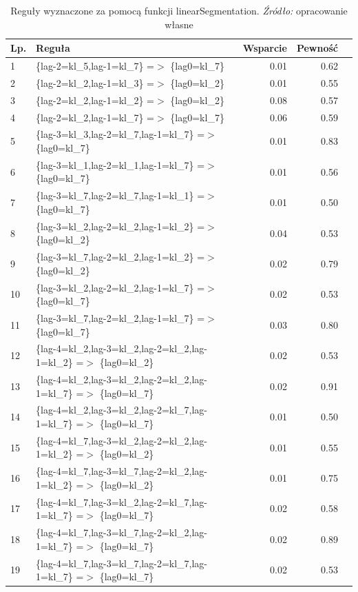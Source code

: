 \documentclass[polish, twoside, 12pt, a4paper]{article}
\theoremstyle{definition}
\theoremstyle{plain}
\theoremstyle{remark}
\begin{document}
\begin{table}[H]
\caption{Reguły wyznaczone za pomocą funkcji linearSegmentation. \textit{Źródło:} opracowanie własne}
\label{tab006}
\begin{tabular}{llrrr}
Lp. & Reguła & Wsparcie & Pewność  \\ 
  \hline
1 & \{lag-2=kl\_5,lag-1=kl\_7\} =$>$ \{lag0=kl\_7\} & 0.01 & 0.62  \\ 
2 & \{lag-2=kl\_2,lag-1=kl\_3\} =$>$ \{lag0=kl\_2\} & 0.01 & 0.55  \\ 
3 & \{lag-2=kl\_2,lag-1=kl\_2\} =$>$ \{lag0=kl\_2\} & 0.08 & 0.57  \\ 
4 & \{lag-2=kl\_2,lag-1=kl\_7\} =$>$ \{lag0=kl\_7\} & 0.06 & 0.59  \\ 
5 & \{lag-3=kl\_3,lag-2=kl\_7,lag-1=kl\_7\} =$>$ \{lag0=kl\_7\} & 0.01 & 0.83  \\ 
6 & \{lag-3=kl\_1,lag-2=kl\_1,lag-1=kl\_7\} =$>$ \{lag0=kl\_7\} & 0.01 & 0.56  \\ 
7 & \{lag-3=kl\_7,lag-2=kl\_7,lag-1=kl\_1\} =$>$ \{lag0=kl\_7\} & 0.01 & 0.50  \\ 
8 & \{lag-3=kl\_2,lag-2=kl\_2,lag-1=kl\_2\} =$>$ \{lag0=kl\_2\} & 0.04 & 0.53  \\ 
9 & \{lag-3=kl\_7,lag-2=kl\_2,lag-1=kl\_2\} =$>$ \{lag0=kl\_2\} & 0.02 & 0.79  \\ 
10 & \{lag-3=kl\_2,lag-2=kl\_2,lag-1=kl\_7\} =$>$ \{lag0=kl\_7\} & 0.02 & 0.53  \\ 
11 & \{lag-3=kl\_7,lag-2=kl\_2,lag-1=kl\_7\} =$>$ \{lag0=kl\_7\} & 0.03 & 0.80  \\ 
12 & \{lag-4=kl\_2,lag-3=kl\_2,lag-2=kl\_2,lag-1=kl\_2\} =$>$ \{lag0=kl\_2\} & 0.02 & 0.53  \\ 
13 & \{lag-4=kl\_2,lag-3=kl\_2,lag-2=kl\_2,lag-1=kl\_7\} =$>$ \{lag0=kl\_7\} & 0.02 & 0.91  \\ 
14 & \{lag-4=kl\_2,lag-3=kl\_2,lag-2=kl\_7,lag-1=kl\_7\} =$>$ \{lag0=kl\_7\} & 0.01 & 0.50  \\ 
15 & \{lag-4=kl\_7,lag-3=kl\_2,lag-2=kl\_2,lag-1=kl\_2\} =$>$ \{lag0=kl\_2\} & 0.01 & 0.55  \\ 
16 & \{lag-4=kl\_7,lag-3=kl\_7,lag-2=kl\_2,lag-1=kl\_2\} =$>$ \{lag0=kl\_2\} & 0.01 & 0.75  \\ 
17 & \{lag-4=kl\_7,lag-3=kl\_2,lag-2=kl\_7,lag-1=kl\_7\} =$>$ \{lag0=kl\_7\} & 0.02 & 0.58  \\ 
18 & \{lag-4=kl\_7,lag-3=kl\_7,lag-2=kl\_2,lag-1=kl\_7\} =$>$ \{lag0=kl\_7\} & 0.02 & 0.89  \\ 
19 & \{lag-4=kl\_7,lag-3=kl\_7,lag-2=kl\_7,lag-1=kl\_7\} =$>$ \{lag0=kl\_7\} & 0.02 & 0.53 
\end{tabular}
\end{table}
\end{document}

